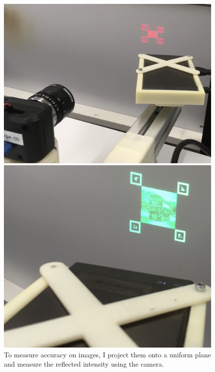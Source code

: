 \begin{figure}[hbt!]
    \centering
    \parbox{.45\textwidth}{
    \includegraphics[height = .7\linewidth]{chapters/papers/ED/resources/images/coco/setup.jpeg}
    }
    \parbox{.45\textwidth}{
    \includegraphics[height = .7\linewidth]{chapters/papers/ED/resources/images/coco/setup_close.jpeg}
    }
    \caption[Image Projection Setup]{To measure accuracy on images, I project them onto a uniform plane and measure the reflected intensity using the camera.}
    \label{fig:COCOSetup}
\end{figure}